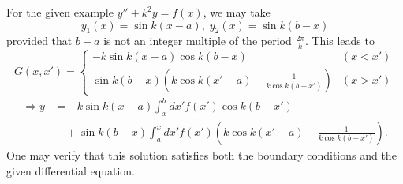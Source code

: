 For the given example $y'' + k^2 y = f(x)$, we may take
\[
	y_1(x) = \sin k(x - a),\; y_2(x) = \sin k(b - x)
\]
provided that $b - a$ is not an integer multiple of the period $\frac{2\pi}{k}$.
This leads to
\[
	G(x, x') =
	\begin{cases}
		-k\sin k(x - a) \cos k(b - x)                                              & (x < x') \\
		\sin k(b - x) \left( k\cos k(x' - a) - \frac{1}{k \cos k (b - x')} \right) & (x > x')
	\end{cases}
\]
\begin{align*}
	\Rightarrow y
	&= -k\sin k(x - a) \int_x^b dx' f(x') \cos k(b - x')                                                \\
	&\quad + \sin k(b - x) \int_a^x dx' f(x') \left( k\cos k(x' - a) - \frac{1}{k \cos k (b - x')} \right).
\end{align*}
One may verify that this solution satisfies both the boundary conditions and the given differential equation.